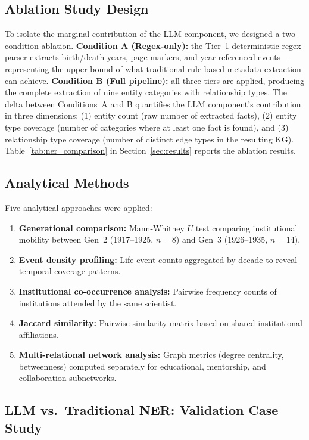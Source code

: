 \documentclass[review]{elsarticle}
\begin{document}
\subsection{Ablation Study Design}

To isolate the marginal contribution of the LLM component, we designed a two-condition ablation. \textbf{Condition A (Regex-only):} the Tier~1 deterministic regex parser extracts birth/death years, page markers, and year-referenced events—representing the upper bound of what traditional rule-based metadata extraction can achieve. \textbf{Condition B (Full pipeline):} all three tiers are applied, producing the complete extraction of nine entity categories with relationship types. The delta between Conditions~A and B quantifies the LLM component's contribution in three dimensions: (1) entity count (raw number of extracted facts), (2) entity type coverage (number of categories where at least one fact is found), and (3) relationship type coverage (number of distinct edge types in the resulting KG). Table~\ref{tab:ner_comparison} in Section~\ref{sec:results} reports the ablation results.

\subsection{Analytical Methods}

Five analytical approaches were applied:
\begin{enumerate}[label=(\arabic*),leftmargin=*]
    \item \textbf{Generational comparison:} Mann-Whitney $U$ test comparing institutional mobility between Gen~2 (1917--1925, $n=8$) and Gen~3 (1926--1935, $n=14$).
    \item \textbf{Event density profiling:} Life event counts aggregated by decade to reveal temporal coverage patterns.
    \item \textbf{Institutional co-occurrence analysis:} Pairwise frequency counts of institutions attended by the same scientist.
    \item \textbf{Jaccard similarity:} Pairwise similarity matrix based on shared institutional affiliations.
    \item \textbf{Multi-relational network analysis:} Graph metrics (degree centrality, betweenness) computed separately for educational, mentorship, and collaboration subnetworks.
\end{enumerate}

\subsection{LLM vs.\ Traditional NER: Validation Case Study}
\label{sec:precision}
\end{document}
